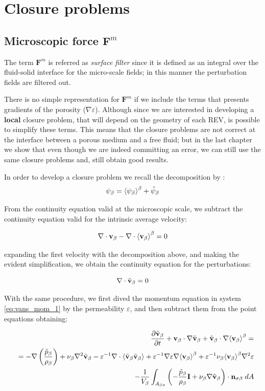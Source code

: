 \section{Closure problems}

\subsection{Microscopic force $\mathbf{F}^m$}
The term $\mathbf{F}^m$ is referred as \textit{surface filter} since it is defined as an integral over the fluid-solid interface for the micro-scale fields; in this manner the perturbation fields are filtered out.

There is no simple representation for $\mathbf{F}^m$ if we include the terms that presents gradients of the porosity ($\nabla \varepsilon$).
Although since we are interested in developing a \textbf{local} closure problem, that will depend on the geometry of each REV, is possible to simplify these terms.
This means that the closure problems are not correct at the interface between a porous medium and a free fluid; but in the last chapter we show that even though we are indeed committing an error, we can still use the same closure problems and, still obtain good results.

In order to develop a closure problem we recall the decomposition by \citet{gray1975derivation}:
\begin{equation}
\psi_{\beta} = {\left< \psi_{\beta} \right>}^{\beta} + \tilde{\psi}_{\beta}
\end{equation}

From the continuity equation valid at the microscopic scale, we subtract the continuity equation valid for the intrinsic average velocity:

$$
\nabla \cdot  \textbf{v}_{\beta} - \nabla \cdot  {\left< \textbf{v}_{\beta}\right>}^{\beta} = 0
$$


expanding the first velocity with the decomposition above, and making the evident simplification, we obtain the continuity equation for the perturbations:

\begin{equation}
\nabla \cdot \tilde{\textbf{v}}_{\beta} = 0 
\end{equation}


With the same procedure, we first dived the momentum equation in system \ref{eq:vans_mom_1} by the permeability $\varepsilon$, and then subtract them from the point equations obtaining:

\begin{eqnarray}
&&  \dfrac{\partial \tilde{\textbf{v}}_{\beta}}{\partial t} + \textbf{v}_{\beta} \cdot \nabla \tilde{\textbf{v}}_{\beta} + \tilde{\textbf{v}}_{\beta} \cdot \nabla {\left< \textbf{v}_{\beta}\right>}^{\beta}  = \nonumber \\
&&= -\nabla \left(\dfrac{\tilde{p}_{\beta}}{\rho_{\beta}}\right) + \nu_{\beta} \nabla^2 \tilde{\textbf{v}}_{\beta} - \varepsilon^{-1}\nabla \cdot  {\left< \tilde{\textbf{v}}_{\beta}\tilde{\textbf{v}}_{\beta}\right>} +  \varepsilon^{-1} \nabla \varepsilon \nabla {\left< \textbf{v}_{\beta}\right>}^{\beta} + \varepsilon^{-1} \nu_{\beta} {\left< \textbf{v}_{\beta} \right>}^{\beta} \nabla^2 \varepsilon \nonumber \\
&&- \dfrac{1}{V_\beta} \displaystyle\int_{A_{\beta \sigma}} \left(-\dfrac{\tilde{p}_{\beta}}{\rho_{\beta}} \mathbf{I}  + \nu_{\beta} \nabla \tilde{\textbf{v}}_{\beta} \right) \cdot \mathbf{n}_{\sigma \beta} \;dA
\label{eq:vans_mom_3}
\end{eqnarray}

